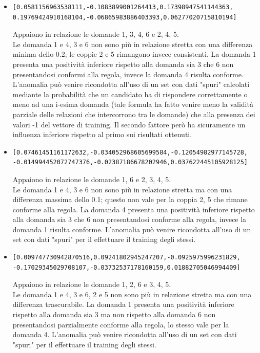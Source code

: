 \begin{itemize}
\item  \begin{verbatim}[0.0581156963538111,-0.1083899001264413,0.17398947541144363,
0.19769424910168104,-0.06865983886403393,0.06277020715810194]\end{verbatim}
Appaiono in relazione le domande 1, 3, 4, 6 e 2, 4, 5.\\
Le domanda 1 e 4, 3 e 6  non sono pi\`u in relazione stretta con una differenza minima dello 0.2; le coppie 2 e 5 rimangono invece consistenti. La domanda 1 presenta una positivit\`a inferiore rispetto alla domanda sia 3 che 6 non presentandosi conformi alla regola, invece la domanda 4 risulta conforme. L'anomalia pu\`o venire ricondotta all'uso di un set con dati "spuri" calcolati mediante la probabilit\`a che un candidato ha di rispondere correttamente o meno ad una i-esima domanda (tale formula ha fatto venire meno la validit\`a parziale delle relazioni che intercorrono tra le domande) che alla presenza dei valori -1 del vettore di training. Il secondo fattore per\`o ha sicuramente un influenza inferiore rispetto al primo sui risultati ottenuti.

\item  \begin{verbatim}[0.07461451161172632,-0.034052968605699584,-0.12054982977145728,
-0.014994452072747376,-0.02387186678202946,0.037622445105928125]\end{verbatim}
Appaiono in relazione le domande 1, 6 e 2, 3, 4, 5.\\
Le domanda 1 e 4, 3 e 6 non sono pi\`u in relazione stretta ma con una differenza massima dello 0.1; questo non vale per la coppia 2, 5 che rimane conforme alla regola. La domanda 4 presenta una positivit\`a inferiore rispetto alla domanda sia 3 che 6 non presentandosi conforme alla regola, invece la domanda 1 risulta conforme. L'anomalia pu\`o venire ricondotta all'uso di un set con dati "spuri" per il effettuare il training degli stessi.

\item  \begin{verbatim}[0.009747730942870516,0.09241802945247207,-0.0925975996231829,
-0.17029345029708107,-0.03732537178160159,0.01882705046994409]\end{verbatim}
Appaiono in relazione le domande 1, 2, 6 e 3, 4, 5.\\
Le domanda 1 e 4, 3 e 6, 2 e 5  non sono pi\`u in relazione stretta ma con una differenza trascurabile. La domanda 1 presenta una positivit\`a inferiore rispetto alla domanda sia 3 ma non rispetto alla domanda 6 non presentandosi parzialmente conforme alla regola, lo stesso vale per la domanda 4. L'anomalia pu\`o venire ricondotta all'uso di un set con dati "spuri" per il effettuare il training degli stessi.


\end{itemize}
